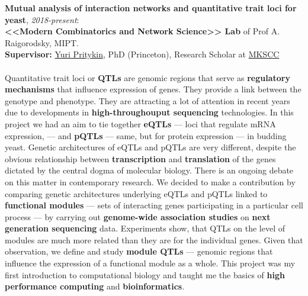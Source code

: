 \documentclass[11pt]{res}
\begin{document}
\begin{resume}
\par 
\textbf{Mutual analysis of interaction networks and quantitative trait loci for yeast}, \textit{2018-present}:\\
\textbf{<<Modern Combinatorics and Network Science>> Lab} of Prof A. Raigorodsky, MIPT.\\
\textbf{Supervisor:} \href{https://scholar.google.com/citations?hl=en&user=Arx56RkJBrYC&view_op=list_works&sortby=pubdate}{Yuri Pritykin}, PhD (Princeton), Research Scholar at \href{https://www.mskcc.org/}{MKSCC}\\\\
Quantitative trait loci or \textbf{QTLs} are genomic regions that serve as \textbf{regulatory mechanisms} that influence expression of genes. They provide a link between the genotype and phenotype. They are attracting a lot of attention in recent years due to developments in \textbf{high-throughouput sequencing }technologies. In this project we had an aim to tie together \textbf{eQTLs} — loci that regulate mRNA expression, — and \textbf{pQTLs} — same, but for protein expression — in budding yeast. Genetic architectures of eQTLs and pQTLs are very different, despite the obvious relationship between \textbf{transcription} and \textbf{translation} of the genes dictated by the central dogma of molecular biology. There is an ongoing debate on this matter in contemporary research. We decided to make a contribution by comparing genetic architectures underlying eQTLs and pQTLs linked to \textbf{functional modules} — sets of interacting genes participating in a particular cell process — by carrying out \textbf{genome-wide association studies} on \textbf{next generation sequencing} data. Experiments show, that QTLs on the level of modules are much more related than they are for the individual genes. Given that observation, we define and study \textbf{module QTLs} — genomic regions that influence the expression of a functional module as a whole. This project was my first introduction to computational biology and taught me the basics of \textbf{high performance computing} and \textbf{bioinformatics}.\\


\end{resume}
\end{document}
